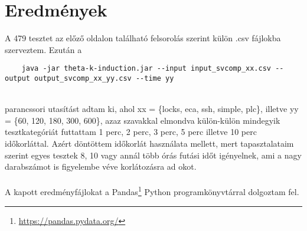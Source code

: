 \section{Eredmények}
\label{sec:kiertekeles_ered}

A 479 tesztet az előző oldalon található felsorolás szerint külön .csv fájlokba szerveztem. Ezután a 
\ \\
\begin{lstlisting}
	java -jar theta-k-induction.jar --input input_svcomp_xx.csv --output output_svcomp_xx_yy.csv --time yy
\end{lstlisting}
\ \\
parancssori utasítást adtam ki, ahol xx = \{locks, eca, ssh, simple, plc\}, illetve yy = \{60, 120, 180, 300, 600\}, azaz szavakkal elmondva külön-külön mindegyik tesztkategóriát futtattam 1 perc, 2 perc, 3 perc, 5 perc illetve 10 perc időkorláttal. Azért döntöttem időkorlát használata mellett, mert tapasztalataim szerint egyes tesztek 8, 10 vagy annál több órás futási időt igényelnek, ami a nagy darabszámot is figyelembe véve korlátozásra ad okot. 
\\
\\
A kapott eredményfájlokat a Pandas\footnote{\url{https://pandas.pydata.org/}} Python programkönyvtárral dolgoztam fel.














